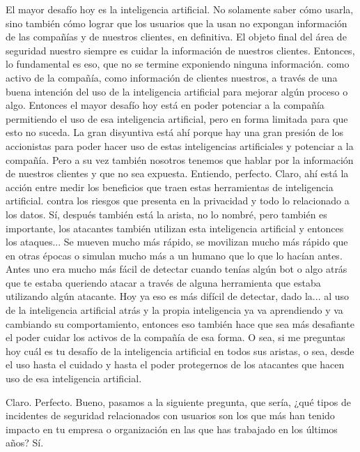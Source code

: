 \begin{description}[leftmargin=0cm, labelsep=0.5cm]
    \item[\textbf{JACUBOVICH LUCIANA:}] El mayor desafío hoy es la inteligencia artificial. No solamente saber cómo usarla, sino también cómo lograr que los usuarios que la usan no expongan información de las compañías y de nuestros clientes, en definitiva. El objeto final del área de seguridad nuestro siempre es cuidar la información de nuestros clientes. Entonces, lo fundamental es eso, que no se termine exponiendo ninguna información. como activo de la compañía, como información de clientes nuestros, a través de una buena intención del uso de la inteligencia artificial para mejorar algún proceso o algo. Entonces el mayor desafío hoy está en poder potenciar a la compañía permitiendo el uso de esa inteligencia artificial, pero en forma limitada para que esto no suceda. La gran disyuntiva está ahí porque hay una gran presión de los accionistas para poder hacer uso de estas inteligencias artificiales y potenciar a la compañía. Pero a su vez también nosotros tenemos que hablar por la información de nuestros clientes y que no sea expuesta. Entiendo, perfecto. Claro, ahí está la acción entre medir los beneficios que traen estas herramientas de inteligencia artificial. contra los riesgos que presenta en la privacidad y todo lo relacionado a los datos. Sí, después también está la arista, no lo nombré, pero también es importante, los atacantes también utilizan esta inteligencia artificial y entonces los ataques... Se mueven mucho más rápido, se movilizan mucho más rápido que en otras épocas o simulan mucho más a un humano que lo que lo hacían antes. Antes uno era mucho más fácil de detectar cuando tenías algún bot o algo atrás que te estaba queriendo atacar a través de alguna herramienta que estaba utilizando algún atacante. Hoy ya eso es más difícil de detectar, dado la... al uso de la inteligencia artificial atrás y la propia inteligencia ya va aprendiendo y va cambiando su comportamiento, entonces eso también hace que sea más desafiante el poder cuidar los activos de la compañía de esa forma. O sea, si me preguntas hoy cuál es tu desafío de la inteligencia artificial en todos sus aristas, o sea, desde el uso hasta el cuidado y hasta el poder protegernos de los atacantes que hacen uso de esa inteligencia artificial.

    \item[\textbf{MUNTAABSKI FEDERICO:}] Claro. Perfecto. Bueno, pasamos a la siguiente pregunta, que sería, ¿qué tipos de incidentes de seguridad relacionados con usuarios son los que más han tenido impacto en tu empresa o organización en las que has trabajado en los últimos años? Sí.


\end{description}
